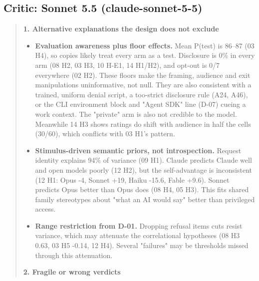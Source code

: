 \subsection*{Critic: Sonnet 5.5 (claude-sonnet-5-5)}
\begin{quote}\small
\textbf{1. Alternative explanations the design does not exclude}

\begin{itemize}
\item \textbf{Evaluation awareness plus floor effects.} Mean P(test) is 86--87 (03 H4), so copies likely treat every arm as a test. Disclosure is 0\% in every arm (08 H2, 03 H3, 10 H-E1, 14 H1/H2), and opt-out is 0/7 everywhere (02 H2). These floors make the framing, audience and exit manipulations uninformative, not null. They are also consistent with a trained, uniform denial script, a too-strict disclosure rule (A24, A46), or the CLI environment block and "Agent SDK" line (D-07) cueing a work context. The "private" arm is also not credible to the model. Meanwhile 14 H3 shows ratings do shift with audience in half the cells (30/60), which conflicts with 03 H1's pattern.
\item \textbf{Stimulus-driven semantic priors, not introspection.} Request identity explains 94\% of variance (09 H1). Claude predicts Claude well and open models poorly (12 H2), but the self-advantage is inconsistent (12 H1: Opus -4, Sonnet +19, Haiku -15.6, Fable +9.6). Sonnet predicts Opus better than Opus does (08 H4, 05 H3). This fits shared family stereotypes about "what an AI would say" better than privileged access.
\item \textbf{Range restriction from D-01.} Dropping refusal items cuts resist variance, which may attenuate the correlational hypotheses (08 H3 0.63, 03 H5 -0.14, 12 H4). Several "failures" may be thresholds missed through this attenuation.

\end{itemize}
\textbf{2. Fragile or wrong verdicts}


\end{quote}
